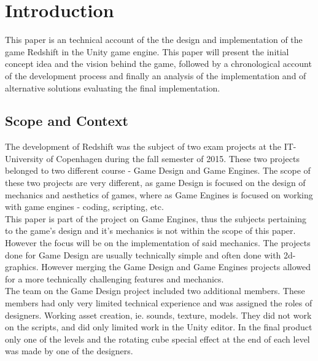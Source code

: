 \section{Introduction}
 This paper is an technical account of the the design and implementation of the game Redshift in the Unity game engine. This paper will present the initial concept idea and the vision behind the game, followed by a chronological account of the development process and finally an analysis of the implementation and of alternative solutions evaluating the final implementation.
\subsection{Scope and Context}
The development of Redshift was the subject of two exam projects at the IT-University of Copenhagen during the fall semester of 2015.
These two projects belonged to two different course - Game Design and Game Engines.
The scope of these two projects are very different, as game Design is focused on the design of mechanics and aesthetics of games, where as Game Engines is focused on working with game engines - coding, scripting, etc.\\

This paper is part of the project on Game Engines, thus the subjects pertaining to the game's design and it's mechanics is not within the scope of this paper. However the focus will be on the implementation of said mechanics.
The projects done for Game Design are usually technically simple and often done with 2d-graphics. However merging the Game Design and Game Engines projects allowed for a more technically challenging features and mechanics.\\

The team on the Game Design project included two additional members. These members had only very limited technical experience and was assigned the roles of designers. Working asset creation, ie. sounds, texture, models. They did not work on the scripts, and did only limited work in the Unity editor. In the final product only one of the levels and the rotating cube special effect at the end of each level was made by one of the designers.




